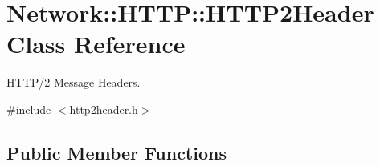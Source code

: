 \hypertarget{classNetwork_1_1HTTP_1_1HTTP2Header}{}\section{Network\+:\+:H\+T\+TP\+:\+:H\+T\+T\+P2\+Header Class Reference}
\label{classNetwork_1_1HTTP_1_1HTTP2Header}


H\+T\+T\+P/2 Message Headers.  




{\ttfamily \#include $<$http2header.\+h$>$}

\subsection*{Public Member Functions}
